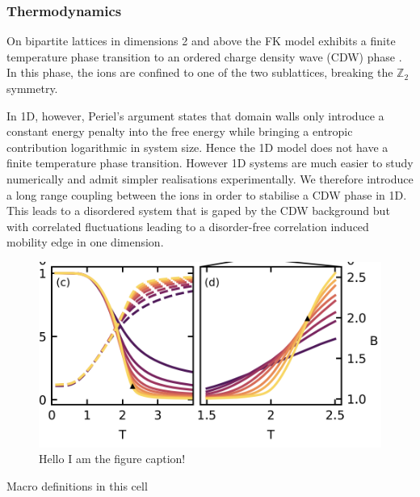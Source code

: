 \hypertarget{thermodynamics}{%
\subsubsection{Thermodynamics}\label{thermodynamics}}

On bipartite lattices in dimensions 2 and above the FK model exhibits a finite temperature phase transition to an ordered charge density wave (CDW) phase \autocite{maskaThermodynamicsTwodimensionalFalicovKimball2006}. In this phase, the ions are confined to one of the two sublattices, breaking the \(\mathbb{Z}_2\) symmetry.

In 1D, however, Periel's argument \autocite{peierlsIsingModelFerromagnetism1936,kennedyItinerantElectronModel1986} states that domain walls only introduce a constant energy penalty into the free energy while bringing a entropic contribution logarithmic in system size. Hence the 1D model does not have a finite temperature phase transition. However 1D systems are much easier to study numerically and admit simpler realisations experimentally. We therefore introduce a long range coupling between the ions in order to stabilise a CDW phase in 1D. This leads to a disordered system that is gaped by the CDW background but with correlated fluctuations leading to a disorder-free correlation induced mobility edge in one dimension.

\begin{figure}
\hypertarget{fig:binder}{%
\centering
\includegraphics[width=1\textwidth,height=\textheight]{figure_code/fk_chapter/binder.png}
\caption[no title]{Hello I am the figure caption!}\label{fig:binder}
}
\end{figure}

Macro definitions in this cell \[
\newcommand{\expval}[1]{\langle #1 \rangle}
\newcommand{\ket}[1]{|#1\rangle}
\newcommand{\bra}[1]{\langle#1|}
\newcommand{\op}[2]{|#1\rangle \langle#2|}
\]

